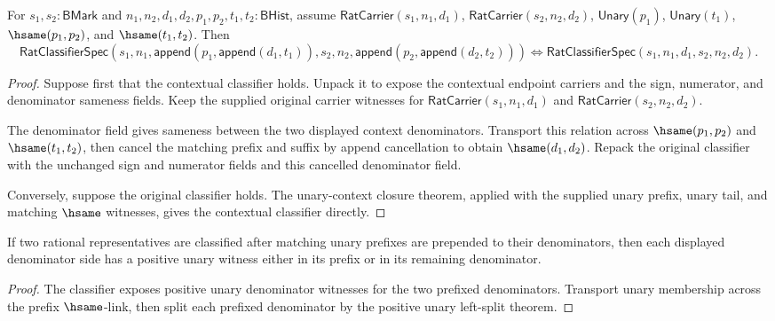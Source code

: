 \begin{theorem}
\label{thm:rat-classifier-unary-denominator-context-exactness}
For $s_1,s_2:\mathsf{BMark}$ and
$n_1,n_2,d_1,d_2,p_1,p_2,t_1,t_2:\mathsf{BHist}$, assume
$\mathsf{RatCarrier}(s_1,n_1,d_1)$,
$\mathsf{RatCarrier}(s_2,n_2,d_2)$, $\mathsf{Unary}(p_1)$,
$\mathsf{Unary}(t_1)$, $\hsame(p_1,p_2)$, and $\hsame(t_1,t_2)$.
Then
$$
\mathsf{RatClassifierSpec}(s_1,n_1,\mathsf{append}(p_1,\mathsf{append}(d_1,t_1)),s_2,n_2,\mathsf{append}(p_2,\mathsf{append}(d_2,t_2)))
\Longleftrightarrow
\mathsf{RatClassifierSpec}(s_1,n_1,d_1,s_2,n_2,d_2).
$$
\end{theorem}
\begin{proof}
Suppose first that the contextual classifier holds. Unpack it to expose the
contextual endpoint carriers and the sign, numerator, and denominator sameness
fields. Keep the supplied original carrier witnesses for
$\mathsf{RatCarrier}(s_1,n_1,d_1)$ and
$\mathsf{RatCarrier}(s_2,n_2,d_2)$.

The denominator field gives sameness between the two displayed context
denominators. Transport this relation across $\hsame(p_1,p_2)$ and
$\hsame(t_1,t_2)$, then cancel the matching prefix and suffix by append
cancellation to obtain $\hsame(d_1,d_2)$. Repack the original classifier with
the unchanged sign and numerator fields and this cancelled denominator field.

Conversely, suppose the original classifier holds. The unary-context closure
theorem, applied with the supplied unary prefix, unary tail, and matching
$\hsame$ witnesses, gives the contextual classifier directly.
\end{proof}

\begin{theorem}
\label{thm:rat-classifier-spec-append-unary-prefix-denominator-split}
If two rational representatives are classified after matching unary prefixes
are prepended to their denominators, then each displayed denominator side has a
positive unary witness either in its prefix or in its remaining denominator.
\end{theorem}
\begin{proof}
The classifier exposes positive unary denominator witnesses for the two
prefixed denominators. Transport unary membership across the prefix
\(\hsame\)-link, then split each prefixed denominator by the positive unary
left-split theorem.
\end{proof}

